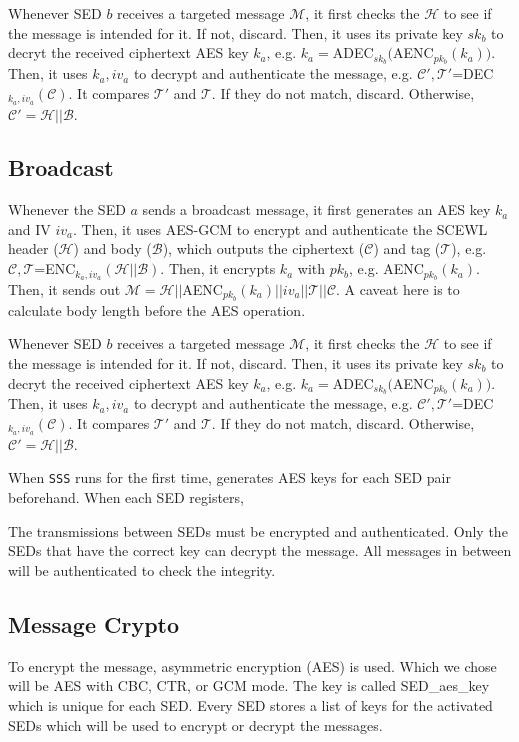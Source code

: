\documentclass[11pt,oneside,onecolumn,letterpaper]{article}
\begin{document}
Whenever SED $b$ receives a targeted message $\mathcal{M}$, it first checks the $\mathcal{H}$ to see if the message is intended for it. If not, discard.
Then, it uses its private key $sk_b$ to decryt the received ciphertext AES key $k_a$, e.g. $k_a=$ADEC$_{sk_b}($AENC$_{pk_b}(k_a))$.
Then, it uses $k_a, iv_a$ to decrypt and authenticate the message, e.g. $\mathcal{C'}, \mathcal{T'}$=DEC$_{k_a, iv_a}(\mathcal{C})$.
It compares $\mathcal{T'}$ and $\mathcal{T}$.
If they do not match, discard.
Otherwise, $\mathcal{C'}=\mathcal{H}||\mathcal{B}$.

\subsection{Broadcast}
Whenever the SED $a$ sends a broadcast message, it first generates an AES key $k_a$ and IV $iv_a$. 
Then, it uses AES-GCM to encrypt and authenticate the SCEWL header ($\mathcal{H}$) and body ($\mathcal{B}$), which outputs the ciphertext ($\mathcal{C}$) and tag ($\mathcal{T}$), e.g. $\mathcal{C}, \mathcal{T}$=ENC$_{k_a, iv_a}(\mathcal{H} || \mathcal{B})$.
Then, it encrypts $k_a$ with $pk_b$, e.g. AENC$_{pk_b}(k_a)$.
Then, it sends out $\mathcal{M}=\mathcal{H} || $AENC$_{pk_b}(k_a)||iv_a||\mathcal{T}||\mathcal{C}$.
A caveat here is to calculate body length before the AES operation.

Whenever SED $b$ receives a targeted message $\mathcal{M}$, it first checks the $\mathcal{H}$ to see if the message is intended for it. If not, discard.
Then, it uses its private key $sk_b$ to decryt the received ciphertext AES key $k_a$, e.g. $k_a=$ADEC$_{sk_b}($AENC$_{pk_b}(k_a))$.
Then, it uses $k_a, iv_a$ to decrypt and authenticate the message, e.g. $\mathcal{C'}, \mathcal{T'}$=DEC$_{k_a, iv_a}(\mathcal{C})$.
It compares $\mathcal{T'}$ and $\mathcal{T}$.
If they do not match, discard.
Otherwise, $\mathcal{C'}=\mathcal{H}||\mathcal{B}$.

When \verb|SSS| runs for the first time, generates AES keys for each SED pair beforehand. 
When each SED registers,

The transmissions between SEDs must be encrypted and authenticated.
Only the SEDs that have the correct key can decrypt the message.
All messages in between will be authenticated to check the integrity.

\subsection{Message Crypto}
To encrypt the message, asymmetric encryption (AES) is used.
Which we chose will be AES with CBC, CTR, or GCM mode.
The key is called SED\_aes\_key which is unique for each SED.
Every SED stores a list of keys for the activated SEDs which will be used to encrypt or decrypt the messages.
\end{document}
